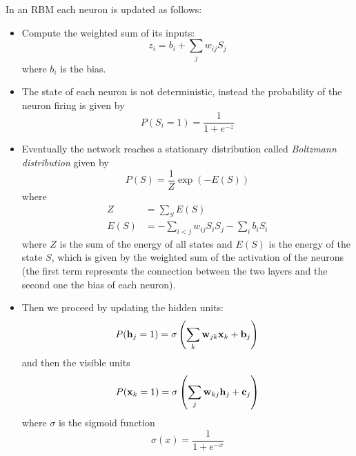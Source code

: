 \documentclass[12pt]{extarticle}
\renewcommand{\vec}[1]{\bvec{#1}}
\begin{document}
In an RBM each neuron is updated as follows:
\begin{itemize}
	\item Compute the weighted sum of its inputs:
	      \begin{equation}
		      z_i = b_i + \sum_j w_{ij} S_j
	      \end{equation}
	      where $b_i$ is the bias.
	\item The state of each neuron is not deterministic, instead the probability of the neuron
	      firing is given by
	      \begin{equation}
		      P(S_i = 1) = \frac{1}{1 + e^{-z}}
	      \end{equation}

	\item Eventually the network reaches a stationary distribution called
	      \emph{Boltzmann distribution} given by
	      \begin{equation}
		      P(S) = \frac{1}{Z} \exp (-E(S))
	      \end{equation}
	      where
	      \begin{align}
		      Z    & = \sum_{S} E(S)                                  \\
		      E(S) & = - \sum_{i < j} w_{ij} S_i S_j - \sum_i b_i S_i
	      \end{align}
	      where $Z$ is the sum of the energy of all states and $E(S)$ is the energy of the state $S$,
	      which is given by the weighted sum of the activation of the neurons (the first term
	      represents the connection between the two layers and the second one the bias of each
	      neuron).

	\item Then we proceed by updating the hidden units:
	      \begin{equation}
		      P(\vec h_j = 1) = \sigma \left( \sum_k \vec w_{jk} \vec x_k + \vec b_j \right)
	      \end{equation}
	      and then the visible units
	      \begin{equation}
		      P(\vec x_k = 1) = \sigma \left( \sum_j \vec w_{kj} \vec h_j + \vec c_j \right)
	      \end{equation}
	      where $\sigma$ is the sigmoid function
	      \begin{equation}
		      \sigma(x) = \frac{1}{1 + e^{-x}}
	      \end{equation}

\end{itemize}
\end{document}
